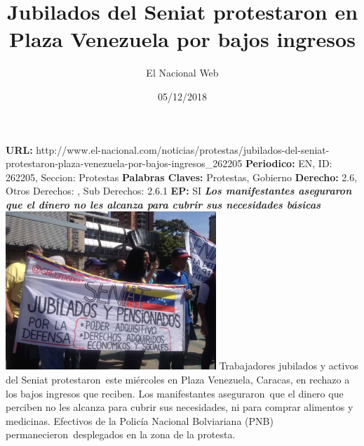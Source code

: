 \documentclass{article}%
\title{\textbf{Jubilados del Seniat protestaron en Plaza Venezuela por bajos ingresos}}%
\author{El Nacional Web}%
\date{05/12/2018}%
\begin{document}
%
\normalsize%
\maketitle%
\textbf{URL: }%
http://www.el{-}nacional.com/noticias/protestas/jubilados{-}del{-}seniat{-}protestaron{-}plaza{-}venezuela{-}por{-}bajos{-}ingresos\_262205\newline%
%
\textbf{Periodico: }%
EN, %
ID: %
262205, %
Seccion: %
Protestas\newline%
%
\textbf{Palabras Claves: }%
Protestas, Gobierno\newline%
%
\textbf{Derecho: }%
2.6, %
Otros Derechos: %
, %
Sub Derechos: %
2.6.1\newline%
%
\textbf{EP: }%
SI\newline%
\newline%
%
\textbf{\textit{Los manifestantes aseguraron que el dinero no les alcanza para cubrir sus necesidades básicas}}%
\newline%
\newline%
%
\includegraphics[width=300px]{225.jpg}%
\newline%
%
Trabajadores jubilados y activos del Seniat protestaron~este miércoles en Plaza Venezuela, Caracas, en rechazo a los bajos ingresos que reciben.%
\newline%
%
Los manifestantes aseguraron~que el dinero que perciben no les alcanza para cubrir sus necesidades, ni para comprar alimentos y medicinas.%
\newline%
%
Efectivos de la Policía Nacional Bolviariana (PNB) permanecieron~desplegados en la zona de la protesta.%
\newline%
%
\end{document}
